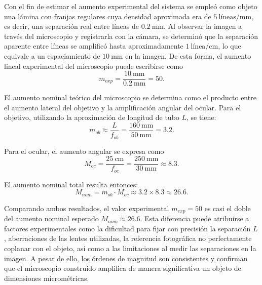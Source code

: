 \documentclass[5p,letterpaper]{article}
\begin{document}
Con el fin de estimar el aumento experimental del sistema se empleó como objeto una lámina con franjas regulares cuya densidad aproximada era de $5 \ \text{líneas/mm}$, es decir, una separación real entre líneas de $0.2 \ \text{mm}$. Al observar la imagen a través del microscopio y registrarla con la cámara, se determinó que la separación aparente entre líneas se amplificó hasta aproximadamente $1 \ \text{línea/cm}$, lo que equivale a un espaciamiento de $10 \ \text{mm}$ en la imagen. De esta forma, el aumento lineal experimental del microscopio puede escribirse como
\begin{equation}
    m_{exp} = \frac{10 \ \text{mm}}{0.2 \ \text{mm}} = 50.
\end{equation}

El aumento nominal teórico del microscopio se determina como el producto entre el aumento lateral del objetivo y la amplificación angular del ocular. Para el objetivo, utilizando la aproximación de longitud de tubo $L$, se tiene:
\begin{equation}
    m_{ob} \approx \frac{L}{f_{ob}} = \frac{160 \ \text{mm}}{50 \ \text{mm}} = 3.2.
\end{equation}

Para el ocular, el aumento angular se expresa como
\begin{equation}
    M_{oc} = \frac{25 \ \text{cm}}{f_{oc}} = \frac{250 \ \text{mm}}{30 \ \text{mm}} \approx 8.3.
\end{equation}

El aumento nominal total resulta entonces:
\begin{equation}
    M_{nom} = m_{ob} \cdot M_{oc} \approx 3.2 \times 8.3 \approx 26.6.
\end{equation}

Comparando ambos resultados, el valor experimental $m_{exp}=50$ es casi el doble del aumento nominal esperado $M_{nom}\approx 26.6$. Esta diferencia puede atribuirse a factores experimentales como la dificultad para fijar con precisión la separación $L$, aberraciones de las lentes utilizadas, la referencia fotográfica no perfectamente coplanar con el objeto, así como a las limitaciones al medir las separaciones en la imagen. A pesar de ello, los órdenes de magnitud son consistentes y confirman que el microscopio construido amplifica de manera significativa un objeto de dimensiones micrométricas.
\end{document}
